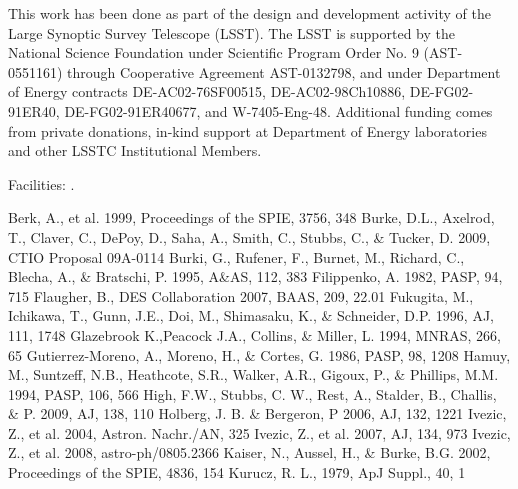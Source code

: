 \documentclass[manuscript]{aastex}
\begin{document}
\acknowledgments
This work has been done as part of the design and development activity of the Large Synoptic Survey Telescope (LSST).
The LSST is supported by the National Science Foundation under Scientific Program Order No. 9 (AST-0551161)
through Cooperative Agreement AST-0132798, and under Department of Energy contracts DE-AC02-76SF00515,
DE-AC02-98Ch10886, DE-FG02-91ER40, DE-FG02-91ER40677, and W-7405-Eng-48.
Additional funding comes from private donations,
in-kind support at Department of Energy laboratories and other LSSTC Institutional Members.

Facilities: .



\begin{thebibliography}{}
 Berk, A., et al. 1999, Proceedings of the SPIE, 3756, 348
 Burke, D.L., Axelrod, T., Claver, C., DePoy, D., Saha, A., Smith, C., Stubbs, C., \& Tucker, D. 2009, CTIO Proposal 09A-0114
 Burki, G., Rufener, F., Burnet, M., Richard, C., Blecha, A., \& Bratschi, P. 1995, A\&AS, 112, 383
 Filippenko, A. 1982, PASP, 94, 715
 Flaugher, B., DES Collaboration 2007, BAAS, 209, 22.01
 Fukugita, M., Ichikawa, T., Gunn, J.E., Doi, M., Shimasaku, K., \& Schneider, D.P. 1996, AJ, 111, 1748
 Glazebrook K.,Peacock J.A., Collins, \& Miller, L. 1994, MNRAS, 266, 65
 Gutierrez-Moreno, A., Moreno, H., \& Cortes, G. 1986, PASP, 98, 1208
 Hamuy, M., Suntzeff, N.B., Heathcote, S.R., Walker, A.R., Gigoux, P., \& Phillips, M.M. 1994, PASP, 106, 566
 High, F.W., Stubbs, C. W., Rest, A., Stalder, B., Challis, \& P. 2009, AJ, 138, 110
 Holberg, J. B. \& Bergeron, P 2006, AJ, 132, 1221
 Ivezic, Z., et al. 2004, Astron. Nachr./AN, 325 
 Ivezic, Z., et al. 2007, AJ, 134, 973
 Ivezic, Z., et al. 2008, astro-ph/0805.2366
 Kaiser, N., Aussel, H., \& Burke, B.G. 2002, Proceedings of the SPIE, 4836, 154
 Kurucz, R. L., 1979, ApJ Suppl., 40, 1

\end{thebibliography}
\end{document}
